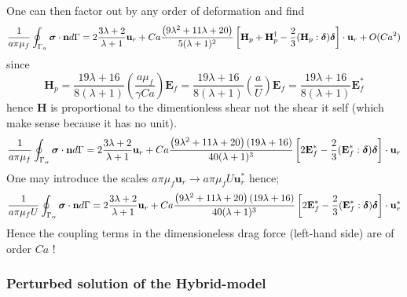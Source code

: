One can then factor out by any order of deformation and find 
\begin{equation}
    \frac{1}{a\pi\mu_f }\oint_{\Gamma_{\alpha}} 
        \bm\sigma\cdot \textbf{n}
     d\Gamma
    =2 \frac{3\lambda +2}{\lambda+1}\textbf{u}_r
    + 
    Ca\frac{\left(9 \lambda^{2} + 11 \lambda + 20\right)}{5(\lambda + 1)^2}\left[
        \textbf{H}_p
        + \textbf{H}_p^\dagger
        -\frac{2}{3}(\textbf{H}_p:\bm\delta)\bm\delta
    \right]\cdot \textbf{u}_r
    + O(Ca^2)
\end{equation}
since 
\begin{equation}    
        \textbf{H}_p
        =
        \frac{19 \lambda + 16}{8 \left(\lambda + 1\right)}
        \left(\frac{a\mu_f}{\gamma Ca}\right)
        \textbf{E}_f
        =
        \frac{19 \lambda + 16}{8 \left(\lambda + 1\right)}
        \left(\frac{a}{U}\right)
        \textbf{E}_f
        =
        \frac{19 \lambda + 16}{8 \left(\lambda + 1\right)}
        \textbf{E}_f^*
\end{equation}
hence \textbf{H} is proportional to the dimentionless shear not the shear it self (which make sense because it has no unit). 
\begin{equation}
    \frac{1}{a\pi\mu_f }\oint_{\Gamma_{\alpha}} 
        \bm\sigma\cdot \textbf{n}
     d\Gamma
    =2 \frac{3\lambda +2}{\lambda+1}\textbf{u}_r
    + 
    Ca
    \frac{\left(9 \lambda^{2} + 11 \lambda + 20\right)(19 \lambda + 16)}{40(\lambda + 1)^3}
    \left[
        2\textbf{E}_f^*
        -\frac{2}{3}(\textbf{E}_f^*:\bm\delta)\bm\delta
    \right]\cdot \textbf{u}_r
\end{equation}
One may introduce the scales  $a \pi \mu_f \textbf{u}_r \to a \pi \mu_f U \textbf{u}^*_r$ hence; 
\begin{equation}
    \frac{1}{a\pi\mu_f U }\oint_{\Gamma_{\alpha}} 
        \bm\sigma\cdot \textbf{n}
     d\Gamma
    =2 \frac{3\lambda +2}{\lambda+1}\textbf{u}_r
    + 
    Ca
    \frac{\left(9 \lambda^{2} + 11 \lambda + 20\right)(19 \lambda + 16)}{40(\lambda + 1)^3}
    \left[
        2\textbf{E}_f^*
        -\frac{2}{3}(\textbf{E}_f^*:\bm\delta)\bm\delta
    \right]\cdot \textbf{u}_r^*
\end{equation}
Hence the coupling terms in the dimensioneless drag force (left-hand side) are of order $Ca$ ! 





\subsubsection{Perturbed solution of the Hybrid-model}

